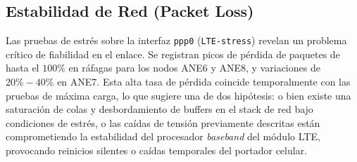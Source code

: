 \documentclass[11pt, a4paper]{article}
\begin{document}
\subsection{Estabilidad de Red (Packet Loss)}
Las pruebas de estrés sobre la interfaz \texttt{ppp0} (\texttt{LTE-stress}) revelan un problema crítico de fiabilidad en el enlace. Se registran picos de pérdida de paquetes de hasta el $100\%$ en ráfagas para los nodos ANE6 y ANE8, y variaciones de $20\%-40\%$ en ANE7. Esta alta tasa de pérdida coincide temporalmente con las pruebas de máxima carga, lo que sugiere una de dos hipótesis: o bien existe una saturación de colas y desbordamiento de buffers en el stack de red bajo condiciones de estrés, o las caídas de tensión previamente descritas están comprometiendo la estabilidad del procesador \textit{baseband} del módulo LTE, provocando reinicios silentes o caídas temporales del portador celular.
\end{document}
